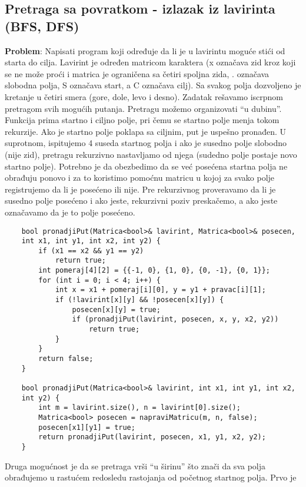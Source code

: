 \documentclass{article}
\begin{document}
\subsection{Pretraga sa povratkom - izlazak iz lavirinta (BFS, DFS)}
\textbf{Problem}: Napisati program koji određuje da li je u lavirintu moguće stići od
starta do cilja. Lavirint je određen matricom karaktera (x označava zid kroz
koji se ne može proći i matrica je ograničena sa četiri spoljna zida, . označava
slobodna polja, S označava start, a C označava cilj). Sa svakog polja dozvoljeno
je kretanje u četiri smera (gore, dole, levo i desno).
\newline
Zadatak rešavamo iscrpnom pretragom svih mogućih putanja. Pretragu možemo
organizovati “u dubinu”. Funkcija prima startno i ciljno polje, pri čemu se
startno polje menja tokom rekurzije. Ako je startno polje poklapa sa ciljnim,
put je uspešno pronađen. U suprotnom, ispitujemo 4 suseda startnog polja i
ako je susedno polje slobodno (nije zid), pretragu rekurzivno nastavljamo od
njega (sudedno polje postaje novo startno polje). Potrebno je da obezbedimo
da se već posećena startna polja ne obrađuju ponovo i za to koristimo pomoćnu
matricu u kojoj za svako polje registrujemo da li je posećeno ili nije. Pre
rekurzivnog proveravamo da li je susedno polje posećeno i ako jeste, rekurzivni
poziv preskačemo, a ako jeste označavamo da je to polje posećeno.
\begin{lstlisting}
    bool pronadjiPut(Matrica<bool>& lavirint, Matrica<bool>& posecen,
    int x1, int y1, int x2, int y2) {
        if (x1 == x2 && y1 == y2)
            return true;
        int pomeraj[4][2] = {{-1, 0}, {1, 0}, {0, -1}, {0, 1}};
        for (int i = 0; i < 4; i++) {
            int x = x1 + pomeraj[i][0], y = y1 + pravac[i][1];
            if (!lavirint[x][y] && !posecen[x][y]) {
                posecen[x][y] = true;
                if (pronadjiPut(lavirint, posecen, x, y, x2, y2))
                    return true;
            }
        }
        return false;
    }
    
    bool pronadjiPut(Matrica<bool>& lavirint, int x1, int y1, int x2,
    int y2) {
        int m = lavirint.size(), n = lavirint[0].size();
        Matrica<bool> posecen = napraviMatricu(m, n, false);
        posecen[x1][y1] = true;
        return pronadjiPut(lavirint, posecen, x1, y1, x2, y2);
    }
\end{lstlisting}
Druga mogućnost je da se pretraga vrši “u širinu” što znači da sva polja obrađujemo u rastućem redosledu rastojanja od početnog startnog polja. Prvo je
\end{document}
